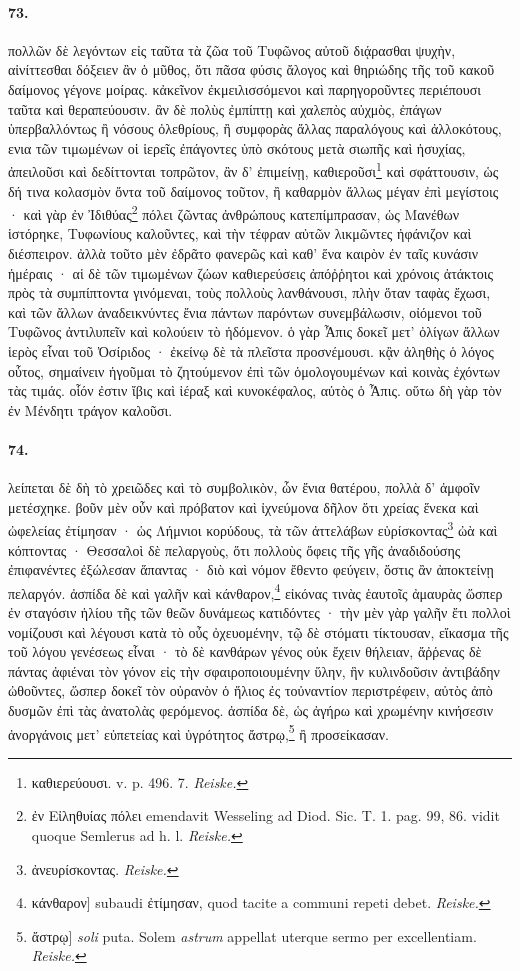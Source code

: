 \documentclass[a4paper, 11pt, oneside, polutonikogreek, german, landscape]{article}
\begin{document}
\paragraph{73.}
πολλῶν δὲ λεγόντων εἰς ταῦτα τὰ ζῶα τοῦ Τυφῶνος αὐτοῦ διᾴρασθαι ψυχὴν, αἰνίττεσθαι δόξειεν ἂν ὁ μῦθος, ὅτι πᾶσα φύσις ἄλογος καὶ θηριώδης τῆς τοῦ κακοῦ δαίμονος γέγονε μοίρας. κἀκεῖνον ἐκμειλισσόμενοι καὶ παρηγοροῦντες περιέπουσι ταῦτα καὶ θεραπεύουσιν. ἂν δὲ πολὺς ἐμπίπτῃ καὶ χαλεπὸς αὐχμὸς, ἐπάγων ὑπερβαλλόντως ἢ νόσους ὀλεθρίους, ἢ συμφορὰς ἄλλας παραλόγους καὶ ἀλλοκότους, ενια τῶν τιμωμένων οἱ ἱερεῖς ἐπάγοντες ὑπὸ σκότους μετὰ σιωπῆς καὶ ἡσυχίας, ἀπειλοῦσι καὶ δεδίττονται τοπρῶτον, ἂν δ' ἐπιμείνῃ, καθιεροῦσι\footnote{καθιερεύουσι. v. p. 496. 7. \emph{Reiske.}} καὶ σφάττουσιν, ὡς δή τινα κολασμὸν ὄντα τοῦ δαίμονος τοῦτον, ἢ καθαρμὸν ἄλλως μέγαν ἐπὶ μεγίστοις · καὶ γὰρ ἐν Ἰδιθύας\footnote{ἐν Εἰληθυίας πόλει emendavit Wesseling ad Diod. Sic. T. 1. pag. 99, 86. vidit quoque Semlerus ad h. l. \emph{Reiske.}} πόλει ζῶντας ἀνθρώπους κατεπίμπρασαν, ὡς Μανέθων ἱστόρηκε, Τυφωνίους καλοῦντες, καὶ τὴν τέφραν αὐτῶν λικμῶντες ἠφάνιζον καὶ διέσπειρον. ἀλλὰ τοῦτο μὲν ἐδρᾶτο φανερῶς καὶ καθ' ἕνα καιρὸν ἐν ταῖς κυνάσιν ἡμέραις · αἱ δὲ τῶν τιμωμένων ζώων καθιερεύσεις ἀπόῤῥητοι καὶ χρόνοις ἀτάκτοις πρὸς τὰ συμπίπτοντα γινόμεναι, τοὺς πολλοὺς λανθάνουσι, πλὴν ὅταν ταφὰς ἔχωσι, καὶ τῶν ἄλλων ἀναδεικνύντες ἔνια πάντων παρόντων συνεμβάλωσιν, οἰόμενοι τοῦ Τυφῶνος ἀντιλυπεῖν καὶ κολούειν τὸ ἡδόμενον. ὁ γὰρ Ἆπις δοκεῖ μετ' ὀλίγων ἄλλων ἱερὸς εἶναι τοῦ Ὀσίριδος · ἐκείνῳ δὲ τὰ πλεῖστα προσνέμουσι. κᾂν ἀληθὴς ὁ λόγος οὗτος, σημαίνειν ἡγοῦμαι τὸ ζητούμενον ἐπὶ τῶν ὁμολογουμένων καὶ κοινὰς ἐχόντων τὰς τιμάς. οἷόν ἐστιν ἴβις καὶ ἱέραξ καὶ κυνοκέφαλος, αὐτὸς ὁ Ἆπις. οὕτω δὴ γὰρ τὸν ἐν Μένδητι τράγον καλοῦσι.

\paragraph{74.}
λείπεται δὲ δὴ τὸ χρειῶδες καὶ τὸ συμβολικὸν, ὧν ἔνια θατέρου, πολλὰ δ' ἀμφοῖν μετέσχηκε. βοῦν μὲν οὖν καὶ πρόβατον καὶ ἰχνεύμονα δῆλον ὅτι χρείας ἕνεκα καὶ ὠφελείας ἐτίμησαν · ὡς Λήμνιοι κορύδους, τὰ τῶν ἀττελάβων εὑρίσκοντας\footnote{ἀνευρίσκοντας. \emph{Reiske.}} ὠὰ καὶ κόπτοντας · Θεσσαλοὶ δὲ πελαργοὺς, ὅτι πολλοὺς ὄφεις τῆς γῆς ἀναδιδούσης ἐπιφανέντες ἐξώλεσαν ἅπαντας · διὸ καὶ νόμον ἔθεντο φεύγειν, ὅστις ἂν ἀποκτείνῃ πελαργόν. ἀσπίδα δὲ καὶ γαλῆν καὶ κάνθαρον,\footnote{κάνθαρον] subaudi ἐτίμησαν, quod tacite a communi repeti debet. \emph{Reiske.}} εἰκόνας τινὰς ἑαυτοῖς ἀμαυρὰς ὥσπερ ἐν σταγόσιν ἡλίου τῆς τῶν θεῶν δυνάμεως κατιδόντες · τὴν μὲν γὰρ γαλῆν ἔτι πολλοὶ νομίζουσι καὶ λέγουσι κατὰ τὸ οὖς ὀχευομένην, τῷ δὲ στόματι τίκτουσαν, εἴκασμα τῆς τοῦ λόγου γενέσεως εἶναι · τὸ δὲ κανθάρων γένος οὐκ ἔχειν θήλειαν, ἄῤῥενας δὲ πάντας ἀφιέναι τὸν γόνον εἰς τὴν σφαιροποιουμένην ὕλην, ἣν κυλινδοῦσιν ἀντιβάδην ὠθοῦντες, ὥσπερ δοκεῖ τὸν οὐρανὸν ὁ ἥλιος ἐς τοὐναντίον περιστρέφειν, αὐτὸς ἀπὸ δυσμῶν ἐπὶ τὰς ἀνατολὰς φερόμενος. ἀσπίδα δὲ, ὡς ἀγήρω καὶ χρωμένην κινήσεσιν ἀνοργάνοις μετ' εὐπετείας καὶ ὑγρότητος ἄστρῳ,\footnote{ἄστρῳ] \emph{soli} puta. Solem \emph{astrum} appellat uterque sermo per excellentiam. \emph{Reiske.}} ἢ προσείκασαν.
\end{document}
